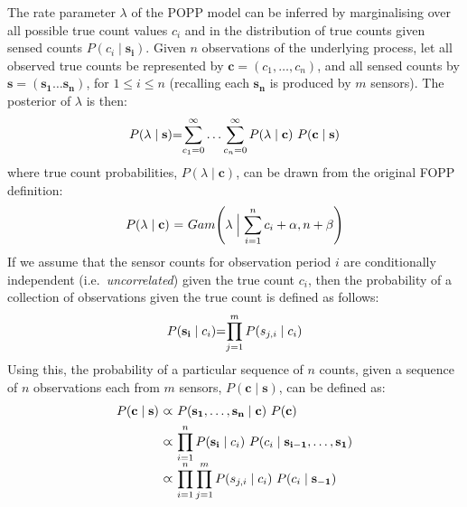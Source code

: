The rate parameter $\lambda$ of the POPP model can be inferred by marginalising over all possible true count values $c_i$ and in the  distribution of true counts given sensed counts $P(c_i \mid \mathbf{s_i})$.
% 
Given $n$ observations of the underlying process, let all observed true counts be represented by $\mathbf{c} = (c_1, \ldots, c_n)$, and all sensed counts by $\mathbf{s}=(\mathbf{s_1} \dots \mathbf{s_n})$, for $1 \leq i \leq n$ (recalling each $\mathbf{s_n}$ is produced by $m$ sensors). 
% 
The posterior of $\lambda$ is then:
\begin{equation}
	\label{eq:marginal_occurrences}
	\begin{tabular}{r@{=}l}
		$P(\lambda \mid \mathbf{s})$ &  $\displaystyle\sum_{c_1=0}^{\infty} \ldots \displaystyle\sum_{c_n=0}^{\infty} P(\lambda \mid \mathbf{c}) ~ P(\mathbf{c} \mid \mathbf{s})$ \\
	\end{tabular}
\end{equation}
\noindent where true count probabilities, $P(\lambda \mid \mathbf{c})$, can be drawn from the original FOPP definition:
\begin{equation}
	\label{eq:gamma_posterior_fopp}
	\begin{tabular}{r@{ = }l}
		$P(\lambda \mid \mathbf{c})$ & $Gam\Bigg(\lambda \Bigm| \displaystyle\sum_{i=1}^{n} c_i + \alpha, n + \beta \Bigg)$
	\end{tabular}
\end{equation}
If we assume that the sensor counts for observation period $i$ are conditionally independent (i.e.~\textit{uncorrelated}) given the true count $c_i$, then the probability of a collection of observations given the true count is defined as follows: 
\begin{equation}
	\label{eq:independent_sensor_likelihood}
	\begin{tabular}{r@{=}l}
	$P(\mathbf{s_i} \mid c_i)$ & $\displaystyle\prod_{j=1}^{m} P(s_{j,i} \mid c_i)$ \\ 
	\end{tabular}
\end{equation}
Using this, the probability of a particular sequence of $n$ counts, given a sequence of $n$ observations each from $m$ sensors, $P(\mathbf{c} \mid \mathbf{s})$, can be defined as:
\begin{equation}
    \label{eq:occurrences_likelihood}
    \begin{tabular}{r@{ $\varpropto$ }l}
        $P(\mathbf{c} \mid \mathbf{s})$ & $P(\mathbf{s_1}, \ldots, \mathbf{s_n} \mid \mathbf{c}) ~ P(\mathbf{c})$ \\ [1ex]
        & $\displaystyle\prod_{i=1}^{n} P(\mathbf{s_i} \mid c_i) ~ P(c_i \mid \mathbf{s_{i-1}}, \ldots, \mathbf{s_{1}})$ \\ [2ex]
        & $\displaystyle\prod_{i=1}^{n} \displaystyle\prod_{j=1}^{m} P(s_{j,i} \mid c_i) ~ P(c_i \mid \mathbf{s_{-1}})$
    \end{tabular}
\end{equation}
